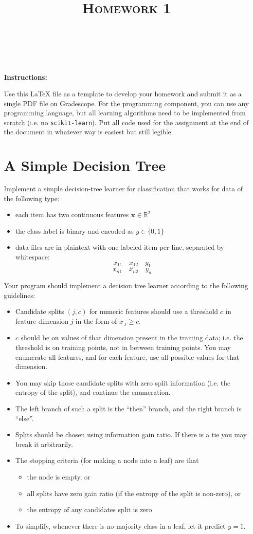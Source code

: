 \documentclass[a4paper]{article}
\title{\textsc{Homework 1}} %
\author{
\red{$>>$NAME HERE$<<$} \\
\red{$>>$ID HERE$<<$}\\
}
\date{}
\theoremstyle{definition}
\newcommand{\RR}{\mathbb{R}}
\def\x{\mathbf x}
\begin{document}
\maketitle 


\textbf{Instructions:} 

Use this LaTeX file as a template to develop your homework and submit it as a single PDF file on Gradescope. 
For the programming component, you can use any programming language, but all learning algorithms need to be implemented from scratch (i.e. no {\tt scikit-learn}).
Put all code used for the assignment at the end of the document in whatever way is easiest but still legible.

\section{A Simple Decision Tree}
Implement a simple decision-tree learner for classification that works for data of the following type:
\begin{itemize}
\item each item has two continuous features $\x \in \RR^2$
\item the class label is binary and encoded as $y \in \{0,1\}$
\item data files are in plaintext with one labeled item per line, separated by whitespace:
$$x_{11} \quad x_{12} \quad y_1$$
$$...$$
$$x_{n1} \quad x_{n2} \quad y_n$$
\end{itemize}

Your program should implement a decision tree learner according to the following guidelines:
\begin{itemize}
\item Candidate splits $(j,c)$ for numeric features should use a threshold $c$ in feature dimension $j$ in the form of $x_{\cdot j}\ge c$.
\item $c$ should be on values of that dimension present in the training data; i.e. the threshold is on training points, not in between training points. You may enumerate all features, and for each feature, use all possible values for that dimension.
\item You may skip those candidate splits with zero split information (i.e. the entropy of the split), and continue the enumeration.
\item The left branch of such a split is the ``then'' branch, and the right branch is ``else''.
\item Splits should be chosen using information gain ratio. If there is a tie you may break it arbitrarily.
\item The stopping criteria (for making a node into a leaf) are that 
	\begin{itemize}
	\item the node is empty, or
	\item all splits have zero gain ratio (if the entropy of the split is non-zero), or
	\item the entropy of any candidates split is zero
	\end{itemize}
\item To simplify, whenever there is no majority class in a leaf, let it predict $y=1$.
\end{itemize}
\end{document}

